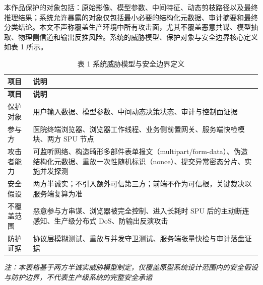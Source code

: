 本作品保护的对象包括：原始影像、模型参数、中间特征、动态剪枝路径以及最终推理结果；系统允许暴露的对象仅包括最小必要的结构化元数据、审计摘要和最终分类结论。本文不声称覆盖生产环境中所有攻击面，尤其不覆盖恶意共谋、模型抽取、物理侧信道和输出反推风险。系统的威胁模型、保护对象与安全边界核心定义如表 1 所示。

\begin{longtable}{>{\raggedright\arraybackslash}p{}>{\raggedright\arraybackslash}p{}}
\caption{表 1 系统威胁模型与安全边界定义}\\
\toprule
\textbf{项目} & \textbf{说明} \\
\midrule
\endfirsthead
\toprule
\textbf{项目} & \textbf{说明} \\
\midrule
\endhead
保护对象 & 用户输入数据、模型参数、中间动态决策状态、审计与控制面证据 \\
参与方 & 医院终端浏览器、浏览器工作线程、业务侧前置网关、服务端快检模块、两方 SPU 节点 \\
攻击者能力 & 可监听网络、构造畸形多部件表单报文（multipart/form-data）、伪造结构化元数据、重放一次性随机标识（nonce）、提交异常密态分片、实施并发探测 \\
安全假设 & 两方半诚实；不引入额外可信第三方；前端不作为可信根，关键裁决以服务端复算为准 \\
不覆盖范围 & 恶意参与方串谋、浏览器被完全控制、进入长耗时 SPU 后的主动断连感知、生产级分布式 DoS、防输出反演攻击 \\
防护证据 & 协议层模糊测试、重放与并发守卫测试、服务端张量快检与审计落盘证据 \\
\bottomrule
\end{longtable}

\noindent\textit{注：本表格基于两方半诚实威胁模型制定，仅覆盖原型系统设计范围内的安全假设与防护边界，不代表生产级系统的完整安全承诺}

